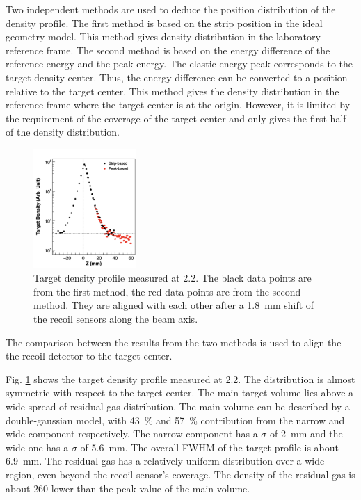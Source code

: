 \documentclass[fleqn,twocolumn,a4paper]{ikpar}
\begin{document}
\par
\medskip
Two independent methods are used to deduce the position distribution of the density profile.
The first method is based on the strip position in the ideal geometry model.
This method gives density distribution in the laboratory reference frame.
The second method is based on the energy difference of the reference energy and
the peak energy.
The elastic energy peak corresponds to the target density center.
Thus, the energy difference can be converted to a position relative to the target center. 
This method gives the density distribution in the reference frame where the
target center is at the origin.
However, it is limited by the requirement of the coverage of the target center
and only gives the first half of the density distribution.
\begin{figure}[t!]
  \centering
	\includegraphics[width=0.35\textwidth]{./target_density_result.png}
  \caption{Target density profile measured at \SI{2.2}{\momentum}. The black
    data points are from the first method, the red data points are from the
    second method. They are aligned with each other after a \SI{1.8}{\mm} shift of
    the recoil sensors along the beam axis.}
  \label{fig:target_density_result}
\end{figure}
The comparison between the results from the two methods is used to align the the recoil detector to the target center.

\par
\medskip

Fig. \ref{fig:target_density_result} shows the target density profile measured at
\SI{2.2}{\momentum}.
The distribution is almost symmetric with respect to the target center.
The main target volume lies above a wide spread of residual gas distribution.
The main volume can be described by a double-gaussian model, with
\SI{43}{\percent} and \SI{57}{\percent} contribution from the narrow and wide
component respectively.
The narrow component has a $\sigma$ of \SI{2}{mm} and the wide one has a $\sigma$ of \SI{5.6}{mm}.
The overall FWHM of the target profile is about \SI{6.9}{mm}.
The residual gas has a relatively uniform distribution over a wide region, even
beyond the recoil sensor's coverage.
The density of the residual gas is about 260 lower than the peak value of the
main volume.
\end{document}
